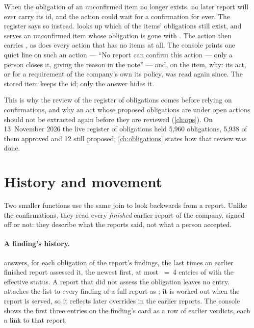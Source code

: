 When the obligation of an unconfirmed item no longer exists, no later report will ever carry
its id, and the action could wait for a confirmation for ever. The register says so instead.
 looks up which of the items' obligations still exist, and
 serves an unconfirmed item whose obligation is gone with
. The action then carries , as does every
action that has no items at all. The console prints one quiet line on such an action ---
\enquote{No report can confirm this action --- only a person closes it, giving the reason in
the note} --- and, on the item, why: its act, or for a requirement of the company's own its
policy, was read again since. The stored item keeps the id; only the answer hides it.

This is why the review of the register of obligations comes before relying on confirmations,
and why an act whose proposed obligations are under open actions should not be extracted
again before they are reviewed (\cref{ch:ops}). On 13~November 2026 the live register of obligations held 5,960
obligations, 5,938 of them approved and 12 still proposed; \cref{ch:obligations} states how
that review was done.


\section{History and movement}\label{sec:register:history}

Two smaller functions use the same join to look backwards from a report. Unlike the
confirmations, they read every \emph{finished} earlier report of the company, signed off or
not: they describe what the reports said, not what a person accepted.

\paragraph{A finding's history.}  answers, for each obligation of the
report's findings, the last times an earlier finished report assessed it, the newest first, at
most ~=~4 entries of  with the effective status.
A report that did not assess the obligation leaves no entry.  attaches
the list to every finding of a full report as ; it is worked out when the report
is served, so it reflects later overrides in the earlier reports. The console shows the first
three entries on the finding's card as a row of earlier verdicts, each a link to that report.

